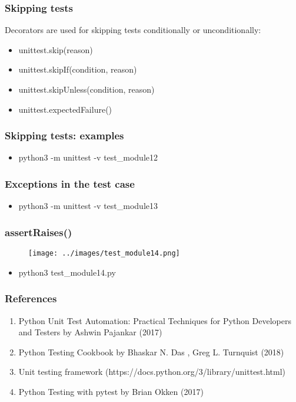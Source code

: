 \documentclass[11pt]{beamer}
\begin{document}
\begin{frame}
\frametitle{Skipping tests}
Decorators are used for skipping tests conditionally or unconditionally:
\begin{itemize}
	\item unittest.skip(reason)
	\item unittest.skipIf(condition, reason)
	\item unittest.skipUnless(condition, reason)
	\item unittest.expectedFailure()
\end{itemize}
\end{frame}

\begin{frame}
\frametitle{Skipping tests: examples}

\begin{itemize}
	\item python3 -m unittest -v test\_module12
\end{itemize}
\end{frame}

\begin{frame}
\frametitle{Exceptions in the test case}

\begin{itemize}
	\item python3 -m unittest -v test\_module13
\end{itemize}
\end{frame}

\begin{frame}
\frametitle{assertRaises()}
\begin{figure}[h]
	\centering
	\texttt{[image: ../images/test\_module14.png]}
\end{figure}
\begin{itemize}
	\item python3 test\_module14.py
\end{itemize}
\end{frame}

\begin{frame}
\frametitle{References}
\begin{enumerate}
	\item Python Unit Test Automation: Practical Techniques for Python Developers and Testers
	by Ashwin Pajankar (2017)
	\item Python Testing Cookbook by Bhaskar N. Das , Greg L. Turnquist (2018)
	\item Unit testing framework (https://docs.python.org/3/library/unittest.html)
	\item Python Testing with pytest by Brian Okken (2017)
\end{enumerate}
\end{frame}
\end{document}
